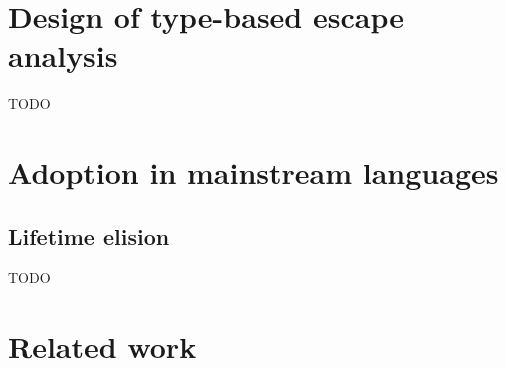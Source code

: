\documentclass[acmsmall]{acmart}
\begin{document}




\section{Design of type-based escape analysis} \label{sec:escape}



TODO %


%




\section{Adoption in mainstream languages} \label{sec:mainstream}


\subsection{Lifetime elision} \label{subsec:lifetime-elision}


TODO %


\section{Related work} \label{sec:related}
\end{document}
